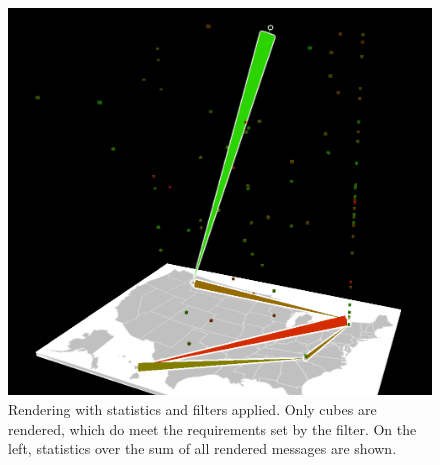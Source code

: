 \begin{figure}
  \includegraphics[width=\linewidth]{figures/exempleary.PNG}
  \caption{Rendering with statistics and filters applied. Only cubes are rendered, which do meet the requirements set by the filter. On the left, statistics over the sum of all rendered messages are shown.}
  \label{fig:example1}
\end{figure}
